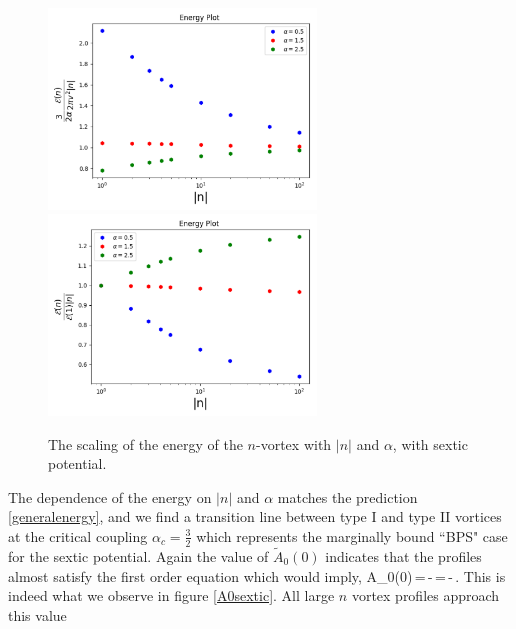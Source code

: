  \begin{figure}[H]
\begin{center}
 \includegraphics[width=2.8in]{Chapter_2_Folder_1912.11321/figures/sixth_order_alpha.pdf}\hspace{0.1in}\includegraphics[width=2.8in]{Chapter_2_Folder_1912.11321/figures/sixth_order_alpha_byE1.pdf}
     \caption[This figure shows the scaling of the energy of the $n$-vortex with $|n|$ and $\alpha$, with sextic potential.]{{ \small The scaling of the energy of the $n$-vortex with $|n|$ and $\alpha$, with sextic potential.}} \label{sexticenergy}
    \end{center}
\end{figure}
The dependence of the energy on $|n|$ and $\alpha$ matches the prediction \eqref{generalenergy}, and we find a transition line between type I and type II vortices at the critical coupling $\alpha_c = \tfrac32$ which represents the marginally bound ``BPS" case for the sextic potential.   Again the value of $\tilde A_0(0)$ indicates that the profiles almost satisfy the first order equation which would imply,
\be
\tilde A_0(0)\,=\,-\,=\,-\,.
\ee
This is indeed what we observe in figure \ref{A0sextic}. All large $n$ vortex profiles approach this value
